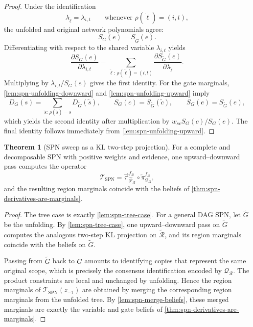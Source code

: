 \documentclass[12pt]{article}
\newcommand{\1}{\mathbb{1}}
\theoremstyle{definition}
\newtheorem{theorem}{Theorem}[section]
\newcommand{\Iproj}{\overleftarrow{\pi}}     %
\newcommand{\Rproj}{\overrightarrow{\pi}}    %
\begin{document}
\begin{proof}
Under the identification
\[
\lambda_{\tilde\ell}=\lambda_{i,t}
\qquad
\text{whenever }\rho(\tilde\ell)=(i,t),
\]
the unfolded and original network polynomials agree:
\[
S_G(e)=S_{\widetilde G}(e).
\]
Differentiating with respect to the shared variable $\lambda_{i,t}$ yields
\[
\frac{\partial S_G(e)}{\partial \lambda_{i,t}}
=
\sum_{\tilde\ell:\,\rho(\tilde\ell)=(i,t)}
\frac{\partial S_{\widetilde G}(e)}{\partial \lambda_{\tilde\ell}}.
\]
Multiplying by $\lambda_{i,t}/S_G(e)$ gives the first identity. For the gate marginals, \cref{lem:spn-unfolding-downward} and \cref{lem:spn-unfolding-upward} imply
\[
D_G(s)
=
\sum_{\tilde s:\,\rho(\tilde s)=s} D_{\widetilde G}(\tilde s),
\qquad
S_G(c)=S_{\widetilde G}(\tilde c),
\qquad
S_G(e)=S_{\widetilde G}(e),
\]
which yields the second identity after multiplication by $w_{sc}S_G(c)/S_G(e)$. The final identity follows immediately from \cref{lem:spn-unfolding-upward}.
\end{proof}

\begin{theorem}[SPN sweep as a KL two-step projection]
\label{prop:spn-two-step}
For a complete and decomposable SPN with positive weights and evidence,
one upward--downward pass computes the operator
\[
\mathcal T_{\mathrm{SPN}}
=
\Rproj^{f_{\mathcal R}}_{\widehat{\mathcal P}_{\mathcal R}}
\circ
\Iproj^{f_{\mathcal R}}_{\mathcal Q_{\mathcal R}},
\]
and the resulting region marginals coincide with the beliefs of
\cref{thm:spn-derivatives-are-marginals}.
\end{theorem}

\begin{proof}
The tree case is exactly \cref{lem:spn-tree-case}. For a general DAG SPN, let $\widetilde G$ be the unfolding. By \cref{lem:spn-tree-case}, one upward--downward pass on $\widetilde G$ computes the analogous two-step KL projection on $\widetilde{\mathcal R}$, and its region marginals coincide with the beliefs on $\widetilde G$.

Passing from $\widetilde G$ back to $G$ amounts to identifying copies that represent the same original scope, which is precisely the consensus identification encoded by $\mathcal Q_{\mathcal R}$. The product constraints are local and unchanged by unfolding. Hence the region marginals of $\mathcal T_{\mathrm{SPN}}(z_{-1})$ are obtained by merging the corresponding region marginals from the unfolded tree. By \cref{lem:spn-merge-beliefs}, these merged marginals are exactly the variable and gate beliefs of \cref{thm:spn-derivatives-are-marginals}.
\end{proof}
\end{document}
